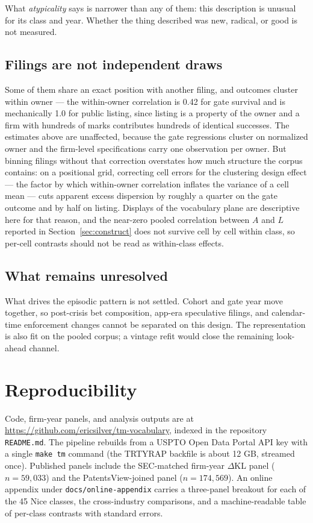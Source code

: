\documentclass[11pt]{article}
\newcommand{\dkl}{$\Delta$KL}
\begin{document}
What \emph{atypicality} says is narrower than any of them: this description
is unusual for its class and year. Whether the thing described was new,
radical, or good is not measured.

\subsection{Filings are not independent draws}

Some of them share an exact position
with another filing, and outcomes cluster within owner --- the
within-owner correlation is 0.42 for gate survival and is mechanically
1.0 for public listing, since listing is a property of the owner and a
firm with hundreds of marks contributes hundreds of identical successes.
The estimates above are unaffected, because the gate regressions cluster
on normalized owner and the firm-level specifications carry one
observation per owner. But binning filings without that correction
overstates how much structure the corpus contains: on a
positional grid, correcting cell errors for the clustering design effect ---
the factor by which within-owner correlation inflates the variance of a cell
mean --- cuts
apparent excess dispersion by roughly a quarter on the gate outcome and
by half on listing. Displays of the vocabulary plane are descriptive
here for that reason, and the near-zero pooled correlation between $A$ and
$L$ reported in Section~\ref{sec:construct} does not survive cell by cell
within class, so per-cell contrasts should not be read as within-class
effects.

\subsection{What remains unresolved}

What drives the episodic pattern is not settled. Cohort and gate year
move together, so post-crisis bet composition, app-era speculative filings,
and calendar-time enforcement changes cannot be separated on this design.
The representation is also fit on the pooled corpus; a vintage refit would
close the remaining look-ahead channel.

\section{Reproducibility}\label{sec:repro}

\begin{sloppypar}
Code, firm-year panels, and analysis outputs are at
\url{https://github.com/ericsilver/tm-vocabulary}, indexed in the repository
\texttt{README.md}. The pipeline rebuilds from a USPTO Open Data Portal API
key with a single \texttt{make tm} command (the TRTYRAP backfile is about
12 GB, streamed once). Published panels include the SEC-matched firm-year
\dkl{} panel ($n = 59{,}033$) and the PatentsView-joined panel
($n = 174{,}569$). An online appendix under
\texttt{docs/online-appendix} carries a three-panel breakout for each of the
45 Nice classes, the cross-industry comparisons, and a machine-readable
table of per-class contrasts with standard errors.
\end{sloppypar}
\end{document}
